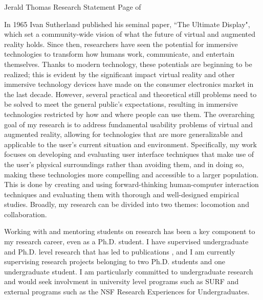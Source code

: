 \newpage

\setcounter{page}{1}
\makecvfooter
  {Jerald Thomas}
  {Research Statement}
  {Page \thepage \hspace{1pt} of \pageref{research_last}}


\makecvheader[C]
\doublespacing


In 1965 Ivan Sutherland published his seminal paper, ``The Ultimate Display", which set a community-wide vision of what the future of virtual and augmented reality holds. Since then, researchers have seen the potential for immersive technologies to transform how humans work, communicate, and entertain themselves. Thanks to modern technology, these potentials are beginning to be realized; this is evident by the significant impact virtual reality and other immersive technology devices have made on the consumer electronics market in the last decade. However, several practical and theoretical still problems need to be solved to meet the general public’s expectations, resulting in immersive technologies restricted by how and where people can use them. The overarching goal of my research is to address fundamental usability problems of virtual and augmented reality, allowing for technologies that are more generalizable and applicable to the user's current situation and environment. Specifically, my work focuses on developing and evaluating user interface techniques that make use of the user's physical surroundings rather than avoiding them, and in doing so, making these technologies more compelling and accessible to a larger population. This is done by creating and using forward-thinking human-computer interaction techniques and evaluating them with thorough and well-designed empirical studies. Broadly, my research can be divided into two themes: locomotion and collaboration.

Working with and mentoring students on research has been a key component to my research career, even as a Ph.D. student. I have supervised undergraduate and Ph.D. level research that has led to publications \cite{you2019strafing, adeniyi2021red, you2022strafing}, and I am currently supervising research projects belonging to two Ph.D. students and one undergraduate student. I am particularly committed to undergraduate research and would seek involvment in university level programs such as SURF and external programs such as the NSF Research Experiences for Undergraduates.

